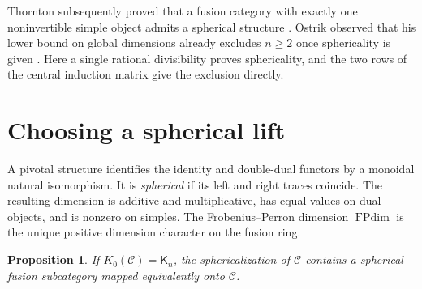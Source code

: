 \documentclass[11pt,a4paper]{article}
\newtheorem{proposition}[theorem]{Proposition}
\newcommand{\cC}{\mathcal C}
\newcommand{\Kn}{\mathsf K}
\DeclareMathOperator{\FPdim}{FPdim}
\numberwithin{equation}{section}
\begin{document}
Thornton subsequently proved
that a fusion category with exactly one noninvertible simple object
admits a spherical structure \cite[Theorem~1.3]{Thornton}.
Ostrik observed that his lower bound on global dimensions already
excludes $n\geq2$ once sphericality is given
\cite[Example~4.1.2]{OstrikDimensions}. Here a single rational
divisibility proves sphericality, and the two rows of the central
induction matrix give the exclusion directly.

\section{Choosing a spherical lift}\label{sec:spherical}

A pivotal structure identifies the identity and double-dual functors
by a monoidal natural isomorphism. It is \emph{spherical} if its left
and right traces coincide. The resulting dimension is additive and
multiplicative, has equal values on dual objects, and is nonzero on
simples. The Frobenius--Perron dimension $\FPdim$ is the unique positive
dimension character on the fusion ring.

\begin{proposition}\label{prop:spherical}
If $K_0(\cC)=\Kn_n$, the sphericalization of $\cC$ contains a
spherical fusion subcategory mapped equivalently onto $\cC$.
\end{proposition}
\end{document}

